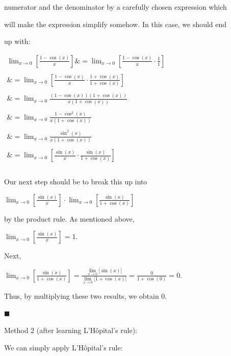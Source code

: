 numerator and the denominator by a carefully chosen expression which

will make the expression simplify somehow. In this case, we should end

up with:



$\begin{aligned}

\lim_{x \to 0}\left[\frac{1-\cos(x)}{x}\right]\&=\lim_{x \to 0} \left[\frac{1-\cos(x)}{x} \cdot \frac{1}{1}\right] \\\\\&=\lim_{x \to 0}\left[\frac{1-\cos(x)}{x} \cdot \frac{1+\cos(x)}{1+\cos(x)}\right] \\\\\&=\lim_{x \to 0}\frac{(1-\cos(x))(1+\cos(x))}{x(1+\cos(x))} \\\\\&=\lim_{x \to 0} \frac{1-\cos^2(x)}{x(1+\cos(x))} \\\\\&=\lim_{x \to 0} \frac{\sin^2(x)}{x(1+\cos(x))} \\\\\&=\lim_{x \to 0}\left[\frac{\sin(x)}{x} \cdot \frac{\sin(x)}{1+\cos(x)}\right]\\\\    \end{aligned}$



Our next step should be to break this up into

$\lim_{x\to0}\left[\frac{\sin(x)}{x}\right]\cdot\lim_{x\to0}\left[\frac{\sin(x)}{1+\cos(x)}\right]$

by the product rule. As mentioned above,

$\lim_{x\to0}\left[\frac{\sin(x)}{x}\right]=1$.



Next,

$\lim_{x\to0}\left[\frac{\sin(x)}{1+\cos(x)}\right]=\frac{\lim\limits_{x\to0}\big[\sin(x)\big]}{\lim\limits_{x\to0}\big[1+\cos(x)\big]}=\frac{0}{1+\cos(0)}=0$.



Thus, by multiplying these two results, we obtain 0.



$\blacksquare$



Method 2 (after learning L'Hôpital's rule):



We can simply apply L'Hôpital's rule:

